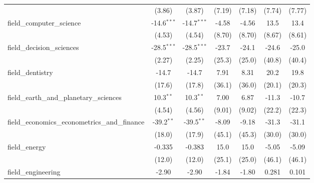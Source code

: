 \begin{tabular}{lcccccc}
                                                               & (3.86)         & (3.87)         & (7.19)        & (7.18)        & (7.74)        & (7.77)\\   
   field\_computer\_science                                    & -14.6$^{***}$  & -14.7$^{***}$  & -4.58         & -4.56         & 13.5          & 13.4\\   
                                                               & (4.53)         & (4.54)         & (8.70)        & (8.70)        & (8.67)        & (8.61)\\   
   field\_decision\_sciences                                   & -28.5$^{***}$  & -28.5$^{***}$  & -23.7         & -24.1         & -24.6         & -25.0\\   
                                                               & (2.27)         & (2.25)         & (25.3)        & (25.0)        & (40.8)        & (40.4)\\   
   field\_dentistry                                            & -14.7          & -14.7          & 7.91          & 8.31          & 20.2          & 19.8\\   
                                                               & (17.6)         & (17.8)         & (36.1)        & (36.0)        & (20.1)        & (20.3)\\   
   field\_earth\_and\_planetary\_sciences                      & 10.3$^{**}$    & 10.3$^{**}$    & 7.00          & 6.87          & -11.3         & -10.7\\   
                                                               & (4.54)         & (4.56)         & (9.01)        & (9.02)        & (22.2)        & (22.3)\\   
   field\_economics\_econometrics\_and\_finance                & -39.2$^{**}$   & -39.5$^{**}$   & -8.09         & -9.18         & -31.3         & -31.1\\   
                                                               & (18.0)         & (17.9)         & (45.1)        & (45.3)        & (30.0)        & (30.0)\\   
   field\_energy                                               & -0.335         & -0.383         & 15.0          & 15.0          & -5.05         & -5.09\\   
                                                               & (12.0)         & (12.0)         & (25.1)        & (25.0)        & (46.1)        & (46.1)\\   
   field\_engineering                                          & -2.90          & -2.90          & -1.84         & -1.80         & 0.281         & 0.101\\   

\end{tabular}
